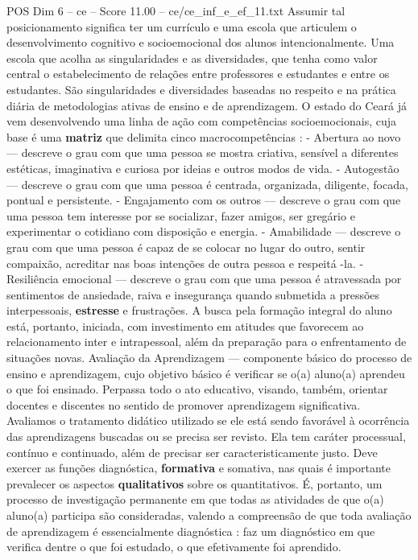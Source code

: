 \begin{textsample}{POS Dim 6 – ce – Score 11.00 – ce/ce\_inf\_e\_ef\_11.txt}
Assumir tal posicionamento significa ter um currículo e uma escola que articulem o desenvolvimento cognitivo e socioemocional dos alunos intencionalmente.
Uma escola que acolha as singularidades e as diversidades, que tenha como valor central o estabelecimento de relações entre professores e estudantes e entre os estudantes.
São singularidades e diversidades baseadas no respeito e na prática diária de metodologias ativas de ensino e de aprendizagem.
O estado do Ceará já vem desenvolvendo uma linha de ação com competências socioemocionais, cuja base é uma \textbf{matriz} que delimita cinco macrocompetências : - Abertura ao novo — descreve o grau com que uma pessoa se mostra criativa, sensível a diferentes estéticas, imaginativa e curiosa por ideias e outros modos de vida. - Autogestão — descreve o grau com que uma pessoa é centrada, organizada, diligente, focada, pontual e persistente. - Engajamento com os outros — descreve o grau com que uma pessoa tem interesse por se socializar, fazer amigos, ser gregário e experimentar o cotidiano com disposição e energia. - Amabilidade — descreve o grau com que uma pessoa é capaz de se colocar no lugar do outro, sentir compaixão, acreditar nas boas intenções de outra pessoa e respeitá -la. - Resiliência emocional — descreve o grau com que uma pessoa é atravessada por sentimentos de ansiedade, raiva e insegurança quando submetida a pressões interpessoais, \textbf{estresse} e frustrações.
A busca pela formação integral do aluno está, portanto, iniciada, com investimento em atitudes que favorecem ao relacionamento inter e intrapessoal, além da preparação para o enfrentamento de situações novas.
Avaliação da Aprendizagem — componente básico do processo de ensino e aprendizagem, cujo objetivo básico é verificar se o(a) aluno(a) aprendeu o que foi ensinado.
Perpassa todo o ato educativo, visando, também, orientar docentes e discentes no sentido de promover aprendizagem significativa.
Avaliamos o tratamento didático utilizado se ele está sendo favorável à ocorrência das aprendizagens buscadas ou se precisa ser revisto.
Ela tem caráter processual, contínuo e continuado, além de precisar ser caracteristicamente justo.
Deve exercer as funções diagnóstica, \textbf{formativa} e somativa, nas quais é importante prevalecer os aspectos \textbf{qualitativos} sobre os quantitativos.
É, portanto, um processo de investigação permanente em que todas as atividades de que o(a) aluno(a) participa são consideradas, valendo a compreensão de que toda avaliação de aprendizagem é essencialmente diagnóstica : faz um diagnóstico em que verifica dentre o que foi estudado, o que efetivamente foi aprendido.

\end{textsample}
